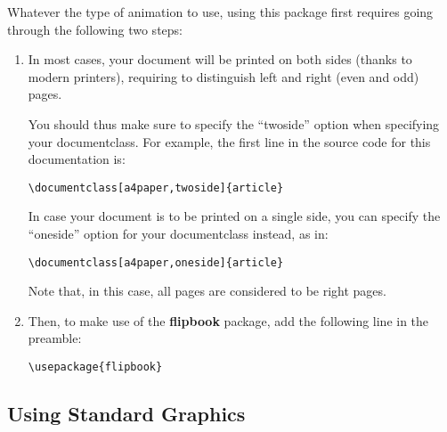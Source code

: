 \documentclass[a4paper,twoside]{article}
\def\flipbook{{\bf flipbook}\xspace}
\begin{document}
Whatever the type of animation to use, using this package first
requires going through the following two steps:
\begin{enumerate}
\item In most cases, your document will be printed on both sides
  (thanks to modern printers), requiring to distinguish left and right
  (even and odd) pages.

  You should thus make sure to specify the ``twoside'' option when
  specifying your documentclass. For example, the first line in the
  source code for this documentation is:
\begin{verbatim}
\documentclass[a4paper,twoside]{article}
\end{verbatim}

  In case your document is to be printed on a single side, you can
  specify the ``oneside'' option for your documentclass instead, as
  in:
\begin{verbatim}
\documentclass[a4paper,oneside]{article}
\end{verbatim}
  Note that, in this case, all pages are considered to be right pages.

\item Then, to make use of the \flipbook package, add the following
  line in the preamble:
\begin{verbatim}
\usepackage{flipbook}
\end{verbatim}
\end{enumerate}

\subsection{Using Standard Graphics}
\end{document}
